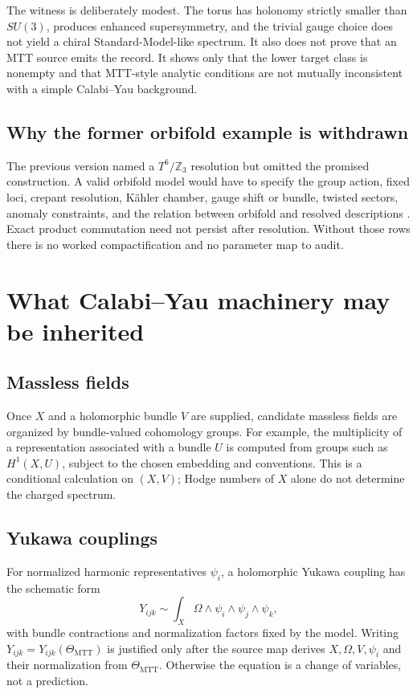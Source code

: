 \documentclass[11pt]{article}
\theoremstyle{definition}
\theoremstyle{remark}
\begin{document}
The witness is deliberately modest.  The torus has holonomy strictly smaller
than \(SU(3)\), produces enhanced supersymmetry, and the trivial gauge choice
does not yield a chiral Standard-Model-like spectrum.  It also does not prove
that an MTT source emits the record.  It shows only that the lower target
class is nonempty and that MTT-style analytic conditions are not mutually
inconsistent with a simple Calabi--Yau background.

\subsection{Why the former orbifold example is withdrawn}

The previous version named a \(T^6/\mathbb Z_3\) resolution but omitted the
promised construction.  A valid orbifold model would have to specify the
group action, fixed loci, crepant resolution, K\"ahler chamber, gauge shift
or bundle, twisted sectors, anomaly constraints, and the relation between
orbifold and resolved descriptions \cite{DixonEtAl1985}.  Exact product
commutation need not persist after resolution.  Without those rows there is
no worked compactification and no parameter map to audit.

\section{What Calabi--Yau machinery may be inherited}
\label{sec:inherit}

\subsection{Massless fields}

Once \(X\) and a holomorphic bundle \(V\) are supplied, candidate massless
fields are organized by bundle-valued cohomology groups.  For example, the
multiplicity of a representation associated with a bundle \(U\) is computed
from groups such as \(H^1(X,U)\), subject to the chosen embedding and
conventions.  This is a conditional calculation on \((X,V)\); Hodge numbers
of \(X\) alone do not determine the charged spectrum.

\subsection{Yukawa couplings}

For normalized harmonic representatives \(\psi_i\), a holomorphic Yukawa
coupling has the schematic form
\[
Y_{ijk}\sim
\int_X\Omega\wedge
\psi_i\wedge\psi_j\wedge\psi_k,
\]
with bundle contractions and normalization factors fixed by the model.
Writing \(Y_{ijk}=Y_{ijk}(\Theta_{\mathrm{MTT}})\) is justified only after the
source map derives \(X,\Omega,V,\psi_i\) and their normalization from
\(\Theta_{\mathrm{MTT}}\).  Otherwise the equation is a change of variables,
not a prediction.
\end{document}
